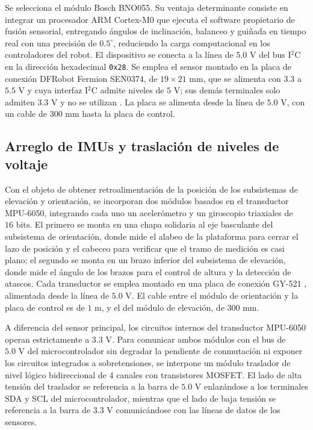 \documentclass[../../General.tex]{subfiles}
\begin{document}
Se selecciona el módulo Bosch BNO055. Su ventaja determinante consiste en integrar un procesador ARM Cortex-M0 que ejecuta el software propietario de fusión sensorial, entregando ángulos de inclinación, balanceo y guiñada en tiempo real con una precisión de $0.5^\circ$, reduciendo la carga computacional en los controladores del robot. El dispositivo se conecta a la línea de $5.0\text{ V}$ del bus I$^2$C en la dirección hexadecimal \texttt{0x28}. Se emplea el sensor montado en la placa de conexión DFRobot Fermion SEN0374, de $19 \times 21\text{ mm}$, que se alimenta con $3.3$ a $5.5\text{ V}$ y cuya interfaz I$^2$C admite niveles de $5\text{ V}$; sus demás terminales solo admiten $3.3\text{ V}$ y no se utilizan \citep{dfrobot_sen0374}. La placa se alimenta desde la línea de $5.0\text{ V}$, con un cable de $300\text{ mm}$ hasta la placa de control.
\subsection{Arreglo de IMUs y traslación de niveles de voltaje}

Con el objeto de obtener retroalimentación de la posición de los subsistemas de elevación y orientación, se incorporan dos módulos basados en el transductor MPU-6050, integrando cada uno un acelerómetro y un giroscopio triaxiales de $16\text{ bits}$. El primero se monta en una chapa solidaria al eje basculante del subsistema de orientación, donde mide el alabeo de la plataforma para cerrar el lazo de posición y el cabeceo para verificar que el tramo de medición es casi plano; el segundo se monta en un brazo inferior del subsistema de elevación, donde mide el ángulo de los brazos para el control de altura y la detección de atascos. Cada transductor se emplea montado en una placa de conexión GY-521 \citep{gy521_mpu6050}, alimentada desde la línea de $5.0\text{ V}$. El cable entre el módulo de orientación y la placa de control es de $1\text{ m}$, y el del módulo de elevación, de $300\text{ mm}$.

A diferencia del sensor principal, los circuitos internos del transductor MPU-6050 operan estrictamente a $3.3\text{ V}$. Para comunicar ambos módulos con el bus de $5.0\text{ V}$ del microcontrolador sin degradar la pendiente de conmutación ni exponer los circuitos integrados a sobretensiones, se interpone un módulo traslador de nivel lógico bidireccional de 4 canales con transistores MOSFET. El lado de alta tensión del traslador se referencia a la barra de $5.0\text{ V}$ enlazándose a los terminales SDA y SCL del microcontrolador, mientras que el lado de baja tensión se referencia a la barra de $3.3\text{ V}$ comunicándose con las líneas de datos de los sensores.
\end{document}
